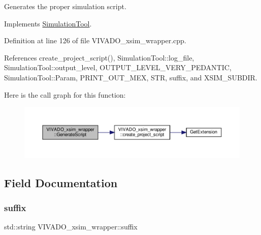Generates the proper simulation script. 



Implements \hyperlink{classSimulationTool_afd99529bb7adb46081071097ceae7643}{Simulation\+Tool}.



Definition at line 126 of file V\+I\+V\+A\+D\+O\+\_\+xsim\+\_\+wrapper.\+cpp.



References create\+\_\+project\+\_\+script(), Simulation\+Tool\+::log\+\_\+file, Simulation\+Tool\+::output\+\_\+level, O\+U\+T\+P\+U\+T\+\_\+\+L\+E\+V\+E\+L\+\_\+\+V\+E\+R\+Y\+\_\+\+P\+E\+D\+A\+N\+T\+IC, Simulation\+Tool\+::\+Param, P\+R\+I\+N\+T\+\_\+\+O\+U\+T\+\_\+\+M\+EX, S\+TR, suffix, and X\+S\+I\+M\+\_\+\+S\+U\+B\+D\+IR.

Here is the call graph for this function\+:
\nopagebreak
\begin{figure}[H]
\begin{center}
\leavevmode
\includegraphics[width=350pt]{d9/d77/classVIVADO__xsim__wrapper_adc04b335afab76135cd6b33997db4203_cgraph}
\end{center}
\end{figure}


\subsection{Field Documentation}
\mbox{\label{classVIVADO__xsim__wrapper_a2a60246f92c8468a49b075003d453508}} 
\subsubsection{\texorpdfstring{suffix}{suffix}}
{\footnotesize\ttfamily std\+::string V\+I\+V\+A\+D\+O\+\_\+xsim\+\_\+wrapper\+::suffix\hspace{0.3cm}{\ttfamily [private]}}



